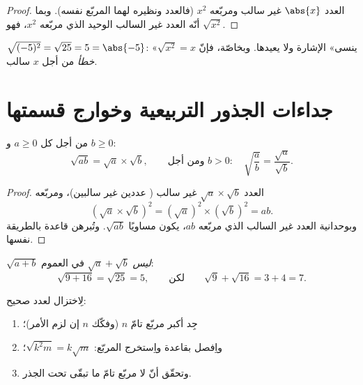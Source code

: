 \begin{proof}
العدد $\abs{x}$ غير سالب ومربّعه $x^2$ (فالعدد ونظيره لهما المربّع
نفسه). وبما أنّه العدد غير السالب الوحيد الذي مربّعه $x^2$، فهو
$\sqrt{x^2}$.
\end{proof}

\begin{example}
$\sqrt{(-5)^2} = \sqrt{25} = 5 = \abs{-5}$:  «ينسى»
الإشارة ولا يعيدها. وبخاصّة، فإنّ $\sqrt{x^2} = x$ \emph{خطأ} من
أجل $x$ سالب.
\end{example}

\section{جداءات الجذور التربيعية وخوارج قسمتها}

\begin{theorem}\label{thm:g9:sqrt:rules}
من أجل كل $a \geq 0$ و $b \geq 0$:
\[
\sqrt{a b} = \sqrt a \times \sqrt b,
\qquad\text{ومن أجل } b > 0:\quad
\sqrt{\frac ab} = \frac{\sqrt a}{\sqrt b} .
\]
\end{theorem}

\begin{proof}
العدد $\sqrt a \times \sqrt b$ غير سالب ( عددين غير
سالبين)، ومربّعه
\[
\left(\sqrt a \times \sqrt b\right)^2
= \left(\sqrt a\right)^2 \times \left(\sqrt b\right)^2
= a b .
\]
وبوحدانية العدد غير السالب الذي مربّعه $ab$، يكون مساويًا
$\sqrt{ab}$. وتُبرهن قاعدة  بالطريقة نفسها.
\end{proof}

\begin{remark}
$\sqrt{a + b}$ \emph{ليس} $\sqrt a + \sqrt b$ في العموم:
\[
\sqrt{9 + 16} = \sqrt{25} = 5,
\qquad\text{لكن}\qquad
\sqrt 9 + \sqrt{16} = 3 + 4 = 7 .
\]
\end{remark}

\begin{method}\label{met:g9:sqrt:simplify}
لِاختزال  لعدد صحيح:
\begin{enumerate}
  \item جِد أكبر مربّع تامّ  $n$ (وفكّك $n$ إن لزم الأمر)؛
  \item واِفصل بقاعدة  واِستخرج المربّع:
        $\sqrt{k^2 m} = k\sqrt m$؛
  \item وتحقّق أنّ لا مربّع تامّ  ما تبقّى تحت الجذر.
\end{enumerate}
\end{method}

